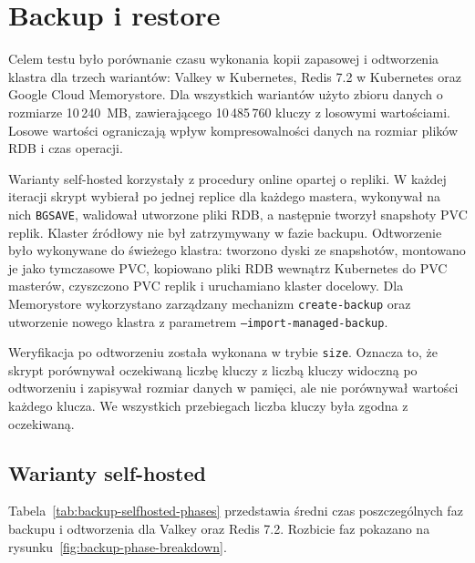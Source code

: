 \section{Backup i restore}

Celem testu było porównanie czasu wykonania kopii zapasowej i odtworzenia klastra dla trzech wariantów: Valkey w Kubernetes, Redis 7.2 w Kubernetes oraz Google Cloud Memorystore. Dla wszystkich wariantów użyto zbioru danych o rozmiarze 10\,240~MB, zawierającego 10\,485\,760 kluczy z losowymi wartościami. Losowe wartości ograniczają wpływ kompresowalności danych na rozmiar plików RDB i czas operacji.

Warianty self-hosted korzystały z procedury online opartej o repliki. W każdej iteracji skrypt wybierał po jednej replice dla każdego mastera, wykonywał na nich \texttt{BGSAVE}, walidował utworzone pliki RDB, a następnie tworzył snapshoty PVC replik. Klaster źródłowy nie był zatrzymywany w fazie backupu. Odtworzenie było wykonywane do świeżego klastra: tworzono dyski ze snapshotów, montowano je jako tymczasowe PVC, kopiowano pliki RDB wewnątrz Kubernetes do PVC masterów, czyszczono PVC replik i uruchamiano klaster docelowy. Dla Memorystore wykorzystano zarządzany mechanizm \texttt{create-backup} oraz utworzenie nowego klastra z parametrem \texttt{--import-managed-backup}.

Weryfikacja po odtworzeniu została wykonana w trybie \texttt{size}. Oznacza to, że skrypt porównywał oczekiwaną liczbę kluczy z liczbą kluczy widoczną po odtworzeniu i zapisywał rozmiar danych w pamięci, ale nie porównywał wartości każdego klucza. We wszystkich przebiegach liczba kluczy była zgodna z oczekiwaną.

\subsection{Warianty self-hosted}

Tabela~\ref{tab:backup-selfhosted-phases} przedstawia średni czas poszczególnych faz backupu i odtworzenia dla Valkey oraz Redis 7.2. Rozbicie faz pokazano na rysunku~\ref{fig:backup-phase-breakdown}.

